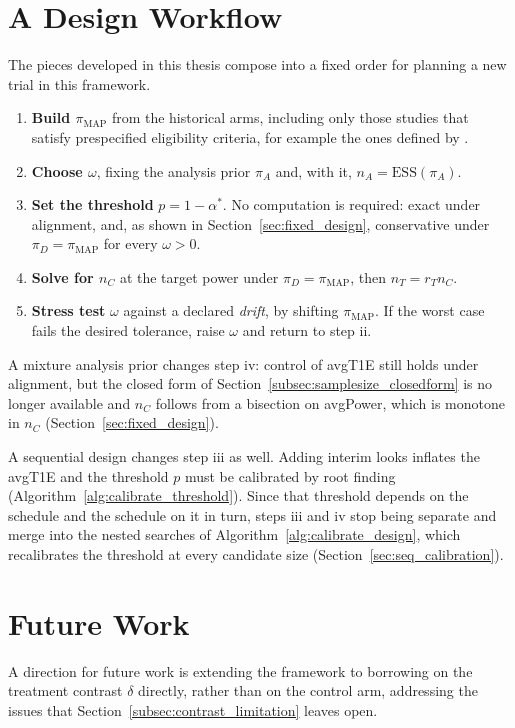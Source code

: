 \section{A Design Workflow}
\label{sec:workflow}
The pieces developed in this thesis compose into a fixed order for planning a new trial in this framework.
\begin{enumerate}
    \item \textbf{Build $\pi_{\text{MAP}}$} from the historical arms, including only those studies that satisfy prespecified
    eligibility criteria, for example the ones defined by \citet{pocock_combination_1976}.
    \item \textbf{Choose $\omega$}, fixing the analysis prior $\pi_A$ and, with it, $n_A = \mathrm{ESS}(\pi_A)$.
    \item \textbf{Set the threshold} $p = 1 - \alpha^\ast$. No computation is required: exact under alignment, and, as shown in Section~\ref{sec:fixed_design}, conservative under $\pi_D = \pi_{\text{MAP}}$ for every $\omega > 0$.
    \item \textbf{Solve for $n_C$} at the target power under $\pi_D = \pi_{\text{MAP}}$, then $n_T = r_T n_C$.
    \item \textbf{Stress test} $\omega$ against a declared \textit{drift}, by shifting $\pi_{\text{MAP}}$. If the worst case fails the desired tolerance, raise $\omega$ and return to step ii.
\end{enumerate}
A mixture analysis prior changes step iv: control of avgT1E still holds under alignment,  but the closed 
form of Section~\ref{subsec:samplesize_closedform} is no
longer available and $n_C$ follows from a bisection on avgPower, which is monotone in $n_C$
(Section~\ref{sec:fixed_design}).

A sequential design changes step iii as well. Adding interim looks inflates the avgT1E
and the threshold $p$ must be calibrated by root finding (Algorithm~\ref{alg:calibrate_threshold}). 
Since that threshold depends on the schedule and the
schedule on it in turn, steps iii and iv stop being separate and merge into the nested searches of
Algorithm~\ref{alg:calibrate_design}, which recalibrates the threshold at every candidate size
(Section~\ref{sec:seq_calibration}).

\section{Future Work}


 A direction for future work is extending the framework to borrowing on the treatment contrast $\delta$
directly, rather than on the control arm, addressing the issues that
Section~\ref{subsec:contrast_limitation} leaves open. 


